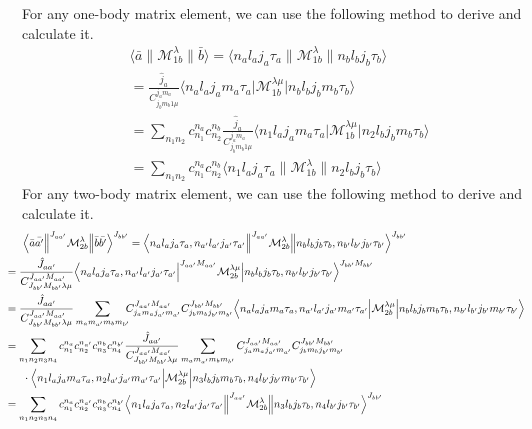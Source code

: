 \documentclass[master]{shnuthesis}
\newcommand{\ap}{a^\prime}
\newcommand{\bp}{b^\prime}
\newcommand{\il}{\!\!\!\!\!\!\!\!\!\!}
\begin{document}
For any one-body matrix element, we can use the following method to derive and calculate it.
\begin{align}
    & \langle \bar{a} \| \mathcal{M}_{1b}^{\lambda} \| \bar{b} \rangle = \Big\langle n_a l_a j_a \tau_a \Big\| \mathcal{M}_{1b}^{\lambda} \Big\| n_b l_b j_b \tau_{b} \Big\rangle \\
    &\il = \frac{\hat{j}_a}{C_{j_b m_b 1 \mu}^{j_a m_a}} \Big\langle n_a l_a j_a m_a \tau_a \Big| \mathcal{M}_{1b}^{\lambda \mu} \Big| n_b l_b j_b m_b \tau_{b} \Big\rangle \\
    &\il = \sum_{n_1 n_2} c_{n_1}^{n_{a}} c_{n_2}^{n_{b}} \frac{\hat{j}_a}{C_{j_b m_b 1 \mu}^{j_a m_a}} \Big\langle n_1 l_a j_a m_a \tau_a \Big| \mathcal{M}_{1b}^{\lambda \mu} \Big| n_2 l_b j_b m_b \tau_{b} \Big\rangle \\
    &\il = \sum_{n_1 n_2} c_{n_1}^{n_{a}} c_{n_2}^{n_{b}} \Big\langle n_1 l_a j_a \tau_a \Big\| \mathcal{M}_{1b}^{\lambda} \Big\| n_2 l_b j_b \tau_{b} \Big\rangle
\end{align}
For any two-body matrix element, we can use the following method to derive and calculate it.
\begin{align}
    & \Big\langle \bar{a} \bar{\ap} \Big\|^{J_{a\ap}} \mathcal{M}_{2b}^{\lambda} \Big\| \bar{b} \bar{\bp} \Big\rangle^{J_{b\bp}} = \Big\langle n_a l_a j_a \tau_a, n_{\ap} l_{\ap} j_{\ap} \tau_{\ap} \Big\|^{J_{a\ap}} \mathcal{M}_{2b}^{\lambda} \Big\| n_b l_b j_b \tau_{b}, n_{\bp} l_{\bp} j_{\bp} \tau_{\bp} \Big\rangle^{J_{b\bp}} \notag\\
    &\il = \frac{\hat{J}_{a\ap}}{C_{J_{b\bp} M_{b\bp} \lambda \mu}^{J_{a\ap} M_{a\ap}}} \Big\langle n_a l_a j_a \tau_a, n_{\ap} l_{\ap} j_{\ap} \tau_{\ap} \Big|^{J_{a\ap} M_{a\ap}} \mathcal{M}_{2b}^{\lambda \mu} \Big| n_b l_b j_b \tau_{b}, n_{\bp} l_{\bp} j_{\bp} \tau_{\bp} \Big\rangle^{J_{b\bp} M_{b\bp}} \\
    &\il = \frac{\hat{J}_{a\ap}}{C_{J_{b\bp} M_{b\bp} \lambda \mu}^{J_{a\ap} M_{a\ap}}} \sum_{m_a m_{\ap} m_b m_{\bp}} \!\!\!C_{j_a m_a j_{\ap} m_{\ap}}^{J_{a\ap} M_{a\ap}} C_{j_b m_b j_{\bp} m_{\bp}}^{J_{b\bp} M_{b\bp}} \Big\langle n_a l_a j_a m_a \tau_a, n_{\ap} l_{\ap} j_{\ap} m_{\ap} \tau_{\ap} \Big| \mathcal{M}_{2b}^{\lambda \mu} \Big| n_b l_b j_b m_b \tau_{b}, n_{\bp} l_{\bp} j_{\bp} m_{\bp} \tau_{\bp} \Big\rangle \\
    &\il = \sum_{n_1 n_2 n_3 n_4} c_{n_1}^{n_{a}} c_{n_2}^{n_{\ap}} c_{n_3}^{n_{b}} c_{n_4}^{n_{\bp}} \frac{\hat{J}_{a\ap}}{C_{J_{b\bp} M_{b\bp} \lambda \mu}^{J_{a\ap} M_{a\ap}}} \sum_{m_a m_{\ap} m_b m_{\bp}} C_{j_a m_a j_{\ap} m_{\ap}}^{J_{a\ap} M_{a\ap}} C_{j_b m_b j_{\bp} m_{\bp}}^{J_{b\bp} M_{b\bp}} \notag\\
    & \cdot \Big\langle n_1 l_a j_a m_a \tau_a, n_2 l_{\ap} j_{\ap} m_{\ap} \tau_{\ap} \Big| \mathcal{M}_{2b}^{\lambda \mu} \Big| n_3 l_b j_b m_b \tau_{b}, n_4 l_{\bp} j_{\bp} m_{\bp} \tau_{\bp} \Big\rangle \\
    &\il = \sum_{n_1 n_2 n_3 n_4} c_{n_1}^{n_{a}} c_{n_2}^{n_{\ap}} c_{n_3}^{n_{b}} c_{n_4}^{n_{\bp}} \Big\langle n_1 l_a j_a \tau_a, n_2 l_{\ap} j_{\ap} \tau_{\ap} \Big\|^{J_{a\ap}} \mathcal{M}_{2b}^{\lambda} \Big\| n_3 l_b j_b \tau_{b}, n_4 l_{\bp} j_{\bp} \tau_{\bp} \Big\rangle^{J_{b\bp}}
\end{align}
\end{document}
